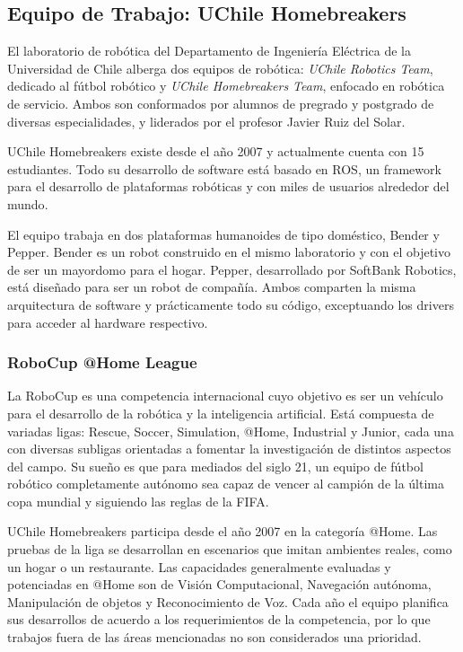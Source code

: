 \subsection{Equipo de Trabajo: UChile Homebreakers}

El laboratorio de robótica del Departamento de Ingeniería Eléctrica de la Universidad de Chile alberga dos equipos de robótica: \textit{UChile Robotics Team}, dedicado al fútbol robótico y \textit{UChile Homebreakers Team}, enfocado en robótica de servicio. Ambos son conformados por alumnos de pregrado y postgrado de diversas especialidades, y liderados por el profesor Javier Ruiz del Solar\cite{uchile-robotics}.

UChile Homebreakers existe desde el año 2007 y actualmente cuenta con 15 estudiantes. Todo su desarrollo de software está basado en ROS, un framework para el desarrollo de plataformas robóticas y con miles de usuarios alrededor del mundo\cite{ROS:2009}.

El equipo trabaja en dos plataformas humanoides de tipo doméstico, Bender y Pepper. Bender es un robot construido en el mismo laboratorio y con el objetivo de ser un mayordomo para el hogar. Pepper, desarrollado por SoftBank Robotics, está diseñado para ser un robot de compañía. Ambos comparten la misma arquitectura de software y prácticamente todo su código, exceptuando los drivers para acceder al hardware respectivo.


\subsubsection{RoboCup @Home League}


La RoboCup es una competencia internacional cuyo objetivo es ser un vehículo para el desarrollo de la robótica y la inteligencia artificial. Está compuesta de variadas ligas: Rescue, Soccer, Simulation, @Home, Industrial y Junior, cada una con diversas subligas orientadas a fomentar la investigación de distintos aspectos del campo. Su sueño es que para mediados del siglo 21, un equipo de fútbol robótico completamente autónomo sea capaz de vencer al campión de la última copa mundial y siguiendo las reglas de la FIFA\cite{robocup:rulebook_2017}.

UChile Homebreakers participa desde el año 2007 en la categoría @Home. Las pruebas de la liga se desarrollan en escenarios que imitan ambientes reales, como un hogar o un restaurante. 
% 
Las capacidades generalmente evaluadas y potenciadas en @Home son de Visión Computacional, Navegación autónoma, Manipulación de objetos y Reconocimiento de Voz. Cada año el equipo planifica sus desarrollos de acuerdo a los requerimientos de la competencia, por lo que trabajos fuera de las áreas mencionadas no son considerados una prioridad.


